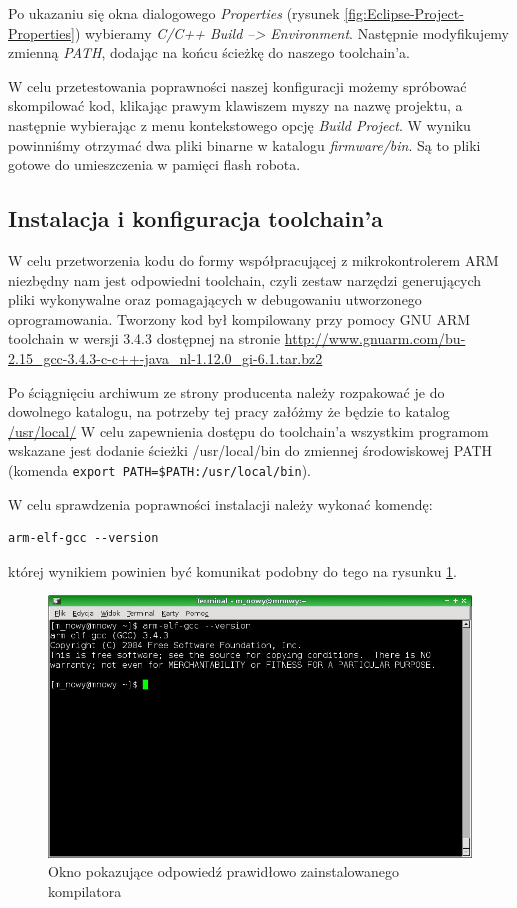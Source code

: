 Po ukazaniu się okna dialogowego \textit{Properties} (rysunek
\ref{fig:Eclipse-Project-Properties}) wybieramy \textit{C/C++ Build -->
Environment}. Następnie modyfikujemy zmienną \textit{PATH}, dodając na końcu
ścieżkę do naszego toolchain'a.

W celu przetestowania poprawności naszej konfiguracji możemy spróbować
skompilować kod, klikając prawym klawiszem myszy na nazwę projektu, a następnie
wybierając z menu kontekstowego opcję \textit{Build Project}. W wyniku powinniśmy
otrzymać dwa pliki binarne w katalogu \textit{firmware/bin}. Są to pliki gotowe
do umieszczenia w pamięci flash robota.

\subsection{Instalacja i konfiguracja toolchain'a}
W celu przetworzenia kodu do formy współpracującej z mikrokontrolerem ARM
niezbędny nam jest odpowiedni toolchain, czyli zestaw narzędzi generujących pliki
wykonywalne oraz pomagających w debugowaniu utworzonego oprogramowania. Tworzony
kod był kompilowany przy pomocy GNU ARM toolchain w wersji 3.4.3 dostępnej na
stronie
\url{http://www.gnuarm.com/bu-2.15_gcc-3.4.3-c-c++-java_nl-1.12.0_gi-6.1.tar.bz2}

Po ściągnięciu archiwum ze strony producenta należy rozpakować je do dowolnego
katalogu, na potrzeby tej pracy załóżmy że będzie to katalog \url{/usr/local/} W
celu zapewnienia dostępu do toolchain'a wszystkim programom wskazane jest
dodanie ścieżki /usr/local/bin do zmiennej środowiskowej PATH (komenda 
\verb|export PATH=$PATH:/usr/local/bin|).

W celu sprawdzenia poprawności instalacji należy wykonać komendę:
\begin{verbatim}
arm-elf-gcc --version 
\end{verbatim}
której wynikiem powinien być komunikat podobny do tego na rysunku \ref{fig:arm-elf-gcc-test}.

\begin{figure}
 \centering
 \includegraphics[width=150.0mm]{../images/ch03/arm-elf-gcc-test.jpg}
 \caption{Okno pokazujące odpowiedź prawidłowo zainstalowanego kompilatora}
 \label{fig:arm-elf-gcc-test}
\end{figure}

